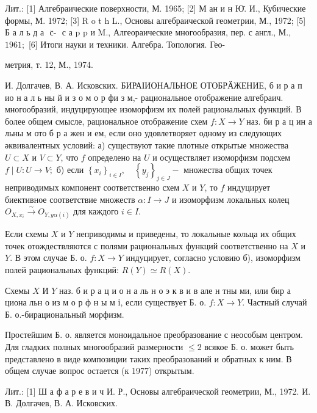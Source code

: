 \documentclass[10pt]{article}
\begin{document}
Лит.: [1] Алгебраические поверхности, М. 1965; [2] М ан и н Ю̈. И., Кубические формы, М. 1972; [3] R o t h L., Основы алгебраической геометрии, М., 1972; [5] Б а л ь д а $\ddot{\text { с- }}$ с а p p и M., Алгеораические многообразия, пер. с англ., М., $1961 ;$ [6] Итоги науки и техники. Алгебра. Топология. Гео-

метрия, т. 12, М., 1974.

И. Долгачев, В. А. Исковских. БИРАІИОНАЛЬНОЕ ОТОБРӒЖЕНИЕ, б и р а п ио н а л ь ны й и з о м о р фи з м,- рациональное отображение алгебраич. многообразий, индуцирующее изоморфизм их полей рациональных функций. В более общем смысле, рациональное отображение схем $f: X \rightarrow Y$ наз. би р а ц ин а льны м ото б р а жен и ем, если оно удовлетворяет одному из следующих әквивалентных условий: а) существуют такие плотные открытые множества $U \subset X$ и $V \subset Y$, что $f$ определено на $U$ и осуществляет изоморфизм подсхем $f \mid U: U \rightarrow V ;$ б) если $\left\{x_{i}\right\}_{i \in I}, \quad\left\{y_{j}\right\}_{j \in J}-$ множества общих точек неприводимых компонент соответственно схем $X$ и $Y$, то $f$ индуцирует биективное соответствие множеств $\alpha: I \rightarrow J$ и изоморфизм локальных колец $O_{X, x_{i}} \stackrel{\sim}{\rightarrow} O_{Y, y \alpha(i)}$ для каждого $i \in I$.



Если схемы $X$ и $Y$ неприводимы и приведены, то локальные кольца их общих точек отождествляются с полями рациональных функций соответственно на $X$ и $Y$. В этом случае Б. о. $f: X \rightarrow Y$ индуцирует, согласно условию б), изоморфизм полей рациональных функций: $R(Y) \simeq R(X)$.



Схемы $X$ И $Y$ наз. б и р а ц и о н а ль н о э к в и в але н тны ми, или бир а циона льн о из м о р ф н ы м і, если существует Б. о. $f: X \rightarrow Y$. Частный случай Б. о.-бирациональный морфизм.



Простейшим Б. о. является моноидальное преобразование с неособым центром. Для гладких полных многообразий размерности $\leqslant 2$ всякое Б. о. может быть представлено в виде композиции таких преобразований и обратных к ним. В общем случае вопрос остается (к 1977) открытым.



Лит.: [1] Ш а ф а р е в и ч И. Р., Основы алгебраической геометрии, М., 1972. И. В. Долгачев, В. А. Исковских.
\end{document}
